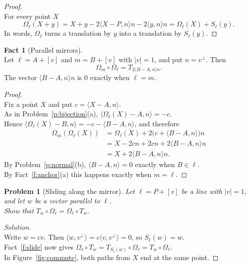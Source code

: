 \documentclass[11pt,a4paper]{article}
\theoremstyle{boxed}
\newtheorem{problem}{Problem}
\theoremstyle{definition}
\newtheorem{fact}{Fact}
\newenvironment{solution}{\begin{proof}[Solution]}{\end{proof}}
\newcommand{\ip}[2]{\langle #1, #2 \rangle}
\newcommand{\abs}[1]{\lvert #1 \rvert}
\begin{document}
\begin{proof}
\leavevmode\\
For every point $X$
\[
\Omega_\ell(X+y)=X+y-2\ip{X-P}{n}n-2\ip{y}{n}n=\Omega_\ell(X)+S_\ell(y).
\]
In words, $\Omega_\ell$ turns a translation by $y$ into a translation by $S_\ell(y)$.
\end{proof}

\begin{fact}[Parallel mirrors]\label{f:parallel-mirrors}
\leavevmode\\
Let $\ell=A+[v]$ and $m=B+[v]$ with $\abs{v}=1$, and put $n=v^\perp$. Then
\[
\Omega_m\circ\Omega_\ell=T_{2\ip{B-A}{n}n}.
\]
The vector $\ip{B-A}{n}n$ is $0$ exactly when $\ell=m$.
\end{fact}

\begin{proof}
\leavevmode\\
Fix a point $X$ and put $c=\ip{X-A}{n}$.\\
As in Problem~\ref{p:bijection}(a), $\ip{\Omega_\ell(X)-A}{n}=-c$.\\
Hence $\ip{\Omega_\ell(X)-B}{n}=-c-\ip{B-A}{n}$, and therefore
\begin{align*}
\Omega_m(\Omega_\ell(X)) &= \Omega_\ell(X)+2\bigl(c+\ip{B-A}{n}\bigr)n\\
&= X-2cn+2cn+2\ip{B-A}{n}n\\
&= X+2\ip{B-A}{n}n.
\end{align*}
By Problem~\ref{p:normal}(b), $\ip{B-A}{n}=0$ exactly when $B\in\ell$.\\
By Fact~\ref{f:anchor}(a) this happens exactly when $m=\ell$.
\end{proof}

\begin{problem}[Sliding along the mirror]\label{p:commute}
Let $\ell=P+[v]$ be a line with $\abs{v}=1$, and let $w$ be a vector parallel to $\ell$.\\
Show that $T_w\circ\Omega_\ell=\Omega_\ell\circ T_w$.
\end{problem}

\begin{solution}
\leavevmode\\
Write $w=cv$. Then $\ip{w}{v^\perp}=c\ip{v}{v^\perp}=0$, so $S_\ell(w)=w$.\\
Fact~\ref{f:slide} now gives $\Omega_\ell\circ T_w=T_{S_\ell(w)}\circ\Omega_\ell=T_w\circ\Omega_\ell$.\\
In Figure~\ref{fig:commute}, both paths from $X$ end at the same point.
\end{solution}
\end{document}
